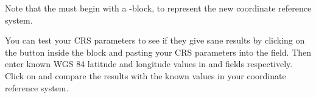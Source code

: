 Note that the  must begin with a -block,
to represent the new coordinate reference system.

You can test your CRS parameters to see if they give sane results by
clicking on the  button inside the  block 
and pasting your CRS parameters into
the  field. Then enter known WGS 84 latitude and longitude
values in  and  fields respectively. 
Click on  and compare the results with the known values in
your coordinate reference system. 

